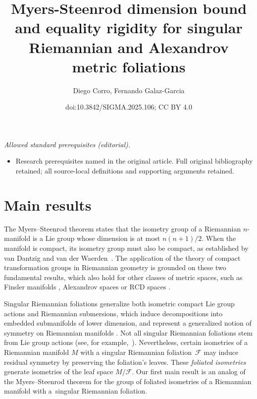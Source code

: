 \documentclass[10pt,a4paper]{amsart}
\title{Myers-Steenrod dimension bound and equality rigidity for singular Riemannian and Alexandrov metric foliations}
\author{Diego Corro, Fernando Galaz-Garcia}
\date{doi:10.3842/SIGMA.2025.106; CC BY 4.0}
\numberwithin{equation}{section}
\theoremstyle{definition}
\newcommand{\fol}{\mathcal{F}}
\begin{document}
\maketitle
\noindent\textit{Allowed standard prerequisites (editorial).}\begin{itemize}
\item Research prerequisites named in the original article. Full original bibliography retained; all source-local definitions and supporting arguments retained.
\end{itemize}\medskip
\section{Main results}
The Myers--Steenrod theorem \cite{MyersSteenrod} states that the isometry group of a Riemannian $n$-manifold is a Lie group whose dimension is at most $n(n+1)/2$. When the manifold is compact, its isometry group must also be compact, as established by van Dantzig and van der Waerden~\cite{van_Dantzig_1928}. The application of the theory of compact transformation groups in Riemannian geometry \mbox{\cite{AlexandrinoBettiol2015,Bredon,Grove2002,Kobayashi}} is grounded on these two fundamental results, which also hold for other classes of metric spaces, such as Finsler manifolds \cite{DengHour2002}, Alexandrov spaces \cite{FukayaYamaguchi1994, GalazGarciaGuijarro2013} or $\mathrm{RCD}$ spaces \cite{GuijarroSantos2018, Sosa2018}.

Singular Riemannian foliations generalize both isometric compact Lie group actions and Riemannian submersions, which induce decompositions into embedded submanifolds of lower dimension, and represent a generalized notion of symmetry on Riemannian manifolds \cite{AlexandrinoRadeschi2017, Corro, CorroMoreno2022, GalazGarciaRadeschi2015, Moreno2019}. Not all singular Riemannian foliations stem from Lie group actions
(see, for example,~\cite{Radeschi2014}). Nevertheless, certain isometries of a Riemannian manifold $M$ with a singular Riemannian foliation~$\fol$ may induce residual symmetry by preserving the foliation's leaves. These \emph{foliated isometries} generate isometries of the leaf space $M/\fol$. Our first main result is an analog of the Myers--Steenrod theorem for the group of foliated isometries of a Riemannian manifold with a~singular Riemannian foliation.
\end{document}
